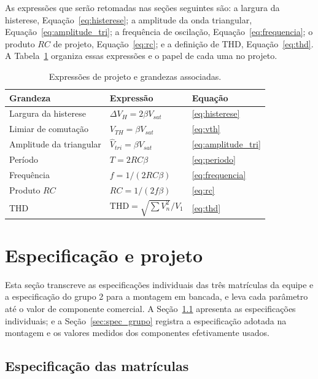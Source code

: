 \documentclass[11pt,a4paper]{article}
\begin{document}
As expressões que serão retomadas nas seções seguintes são: a largura da
histerese, Equação~\eqref{eq:histerese}; a amplitude da onda triangular,
Equação~\eqref{eq:amplitude_tri}; a frequência de oscilação,
Equação~\eqref{eq:frequencia}; o produto $RC$ de projeto,
Equação~\eqref{eq:rc}; e a definição de THD, Equação~\eqref{eq:thd}. A
Tabela~\ref{tab:teo_resumo} organiza essas expressões e o papel de cada uma no
projeto.
 
\begin{table}[htbp]
\centering
\caption{Expressões de projeto e grandezas associadas.}
\label{tab:teo_resumo}
\begin{tabular}{lll}
\hline
Grandeza & Expressão & Equação \\
\hline
Largura da histerese & $\Delta V_H = 2\beta V_{sat}$ & \eqref{eq:histerese} \\
Limiar de comutação & $V_{TH} = \beta V_{sat}$ & \eqref{eq:vth} \\
Amplitude da triangular & $\hat V_{tri} = \beta V_{sat}$ & \eqref{eq:amplitude_tri} \\
Período & $T = 2RC\beta$ & \eqref{eq:periodo} \\
Frequência & $f = 1/(2RC\beta)$ & \eqref{eq:frequencia} \\
Produto $RC$ & $RC = 1/(2f\beta)$ & \eqref{eq:rc} \\
THD & $\text{THD} = \sqrt{\sum V_n^2}/V_1$ & \eqref{eq:thd} \\
\hline
\end{tabular}
\end{table}

\section{Especificação e projeto}
\label{sec:projeto}
 
Esta seção transcreve as especificações individuais das três matrículas da
equipe e a especificação do grupo 2 para a montagem em bancada, e leva cada
parâmetro até o valor de componente comercial. A Seção~\ref{sec:spec_matriculas}
apresenta as especificações individuais; e a Seção~\ref{sec:spec_grupo} registra a especificação adotada na
montagem e os valores medidos dos componentes efetivamente usados.
 
\subsection{Especificação das matrículas}
\label{sec:spec_matriculas}
 
\end{document}
